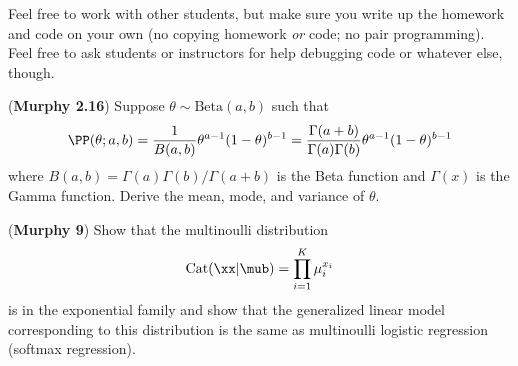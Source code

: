 \documentclass[12pt,letterpaper,fleqn]{hmcpset}
\begin{document}
Feel free to work with other students, but make sure you write up the homework
and code on your own (no copying homework \textit{or} code; no pair programming).
Feel free to ask students or instructors for help debugging code or whatever else,
though.

\begin{problem}[1]
	(\textbf{Murphy 2.16}) Suppose $\theta \sim \text{Beta}(a,b)$ such
	that
	\[
		\PP(\theta; a,b) = \frac{1}{B(a,b)} \theta^{a-1}(1-\theta)^{b-1} = \frac{\Gamma(a+b)}{\Gamma(a)\Gamma(b)} \theta^{a-1}(1-\theta)^{b-1}
	\]
	where $B(a,b) = \Gamma(a)\Gamma(b)/\Gamma(a+b)$ is the Beta function
	and $\Gamma(x)$ is the Gamma function.
	Derive the mean, mode, and variance of $\theta$.
\end{problem}
\begin{solution}
	\vfill
\end{solution}
\newpage

\begin{problem}[2]
	(\textbf{Murphy 9}) Show that the multinoulli distribution
	\[
		\text{Cat}(\xx|\mub) = \prod_{i=1}^K \mu_i^{x_i}
	\]
	is in the exponential family and show that the generalized linear model
	corresponding to this distribution is the same as multinoulli logistic
	regression (softmax regression).
\end{problem}
\begin{solution}
	\vfill
\end{solution}
\newpage
\end{document}
